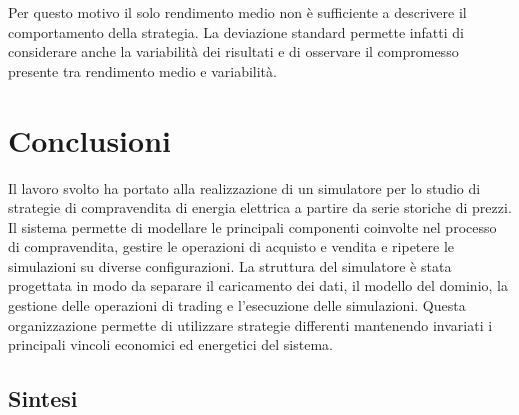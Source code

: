 \documentclass[a4paper,oneside,italian]{sapthesis}
\begin{document}
Per questo motivo il solo rendimento medio non è sufficiente a descrivere il
comportamento della strategia. La deviazione standard permette infatti di
considerare anche la variabilità dei risultati e di osservare il compromesso
presente tra rendimento medio e variabilità.
\chapter{Conclusioni}

\label{chap:conclusions}

Il lavoro svolto ha portato alla realizzazione di un simulatore per lo studio
di strategie di compravendita di energia elettrica a partire da serie storiche
di prezzi. Il sistema permette di modellare le principali componenti coinvolte
nel processo di compravendita, gestire le operazioni di acquisto e vendita e
ripetere le simulazioni su diverse configurazioni.
La struttura del simulatore è stata progettata in modo da separare il caricamento
dei dati, il modello del dominio, la gestione delle operazioni di trading
e l'esecuzione delle simulazioni. Questa organizzazione permette di utilizzare
strategie differenti mantenendo invariati i principali vincoli economici ed energetici del sistema.

\section{Sintesi}
\end{document}
